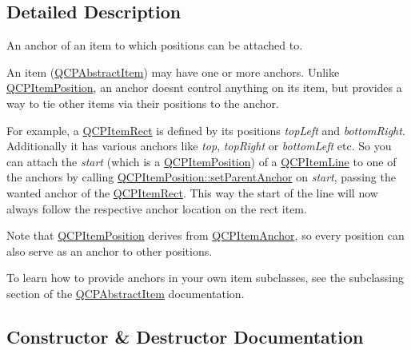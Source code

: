 \subsection{Detailed Description}
An anchor of an item to which positions can be attached to. 

An item (\hyperlink{classQCPAbstractItem}{Q\+C\+P\+Abstract\+Item}) may have one or more anchors. Unlike \hyperlink{classQCPItemPosition}{Q\+C\+P\+Item\+Position}, an anchor doesn\textquotesingle{}t control anything on its item, but provides a way to tie other items via their positions to the anchor.

For example, a \hyperlink{classQCPItemRect}{Q\+C\+P\+Item\+Rect} is defined by its positions {\itshape top\+Left} and {\itshape bottom\+Right}. Additionally it has various anchors like {\itshape top}, {\itshape top\+Right} or {\itshape bottom\+Left} etc. So you can attach the {\itshape start} (which is a \hyperlink{classQCPItemPosition}{Q\+C\+P\+Item\+Position}) of a \hyperlink{classQCPItemLine}{Q\+C\+P\+Item\+Line} to one of the anchors by calling \hyperlink{classQCPItemPosition_ac094d67a95d2dceafa0d50b9db3a7e51}{Q\+C\+P\+Item\+Position\+::set\+Parent\+Anchor} on {\itshape start}, passing the wanted anchor of the \hyperlink{classQCPItemRect}{Q\+C\+P\+Item\+Rect}. This way the start of the line will now always follow the respective anchor location on the rect item.

Note that \hyperlink{classQCPItemPosition}{Q\+C\+P\+Item\+Position} derives from \hyperlink{classQCPItemAnchor}{Q\+C\+P\+Item\+Anchor}, so every position can also serve as an anchor to other positions.

To learn how to provide anchors in your own item subclasses, see the subclassing section of the \hyperlink{classQCPAbstractItem}{Q\+C\+P\+Abstract\+Item} documentation. 

\subsection{Constructor \& Destructor Documentation}
\hypertarget{classQCPItemAnchor_aeb6b681d2bf324db40a915d32ec5624f}{}
